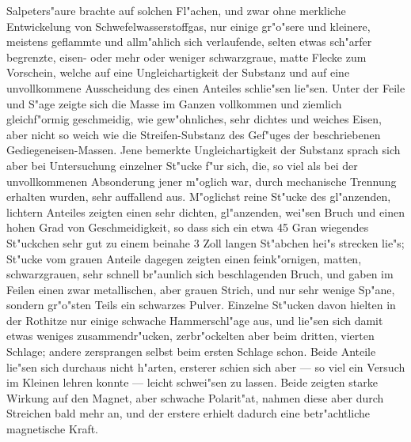 \documentclass[a4paper, 11pt, oneside, german]{article}
\begin{document}
{\hspace*{6mm}Salpeters"aure brachte auf solchen Fl"achen, und zwar ohne merkliche Entwickelung von Schwefelwasserstoffgas, nur einige gr"o"sere und kleinere, meistens geflammte und allm"ahlich sich verlaufende, selten etwas sch"arfer begrenzte, eisen- oder mehr oder weniger schwarzgraue, matte Flecke zum Vorschein, welche auf eine Ungleichartigkeit der Substanz und auf eine unvollkommene Ausscheidung des einen Anteiles schlie"sen lie"sen. Unter der Feile und S"age zeigte sich die Masse im Ganzen vollkommen und ziemlich gleichf"ormig geschmeidig, wie gew"ohnliches, sehr dichtes und weiches Eisen, aber nicht so weich wie die Streifen-Substanz des Gef"uges der beschriebenen Gediegeneisen-Massen. Jene bemerkte Ungleichartigkeit der Substanz sprach sich aber bei Untersuchung einzelner St"ucke f"ur sich, die, so viel als bei der unvollkommenen Absonderung jener m"oglich war, durch mechanische Trennung erhalten wurden, sehr auffallend aus. M"oglichst reine St"ucke des gl"anzenden, lichtern Anteiles zeigten einen sehr dichten, gl"anzenden, wei"sen Bruch und einen hohen Grad von Geschmeidigkeit, so dass sich ein etwa 45 Gran wiegendes St"uckchen sehr gut zu einem beinahe 3 Zoll langen St"abchen hei"s strecken lie"s; St"ucke vom grauen Anteile dagegen zeigten einen feink"ornigen, matten, schwarzgrauen, sehr schnell br"aunlich sich beschlagenden Bruch, und gaben im Feilen einen zwar metallischen, aber grauen Strich, und nur sehr wenige Sp"ane, sondern gr"o"sten Teils ein schwarzes Pulver. Einzelne St"ucken davon hielten in der Rothitze nur einige schwache Hammerschl"age aus, und lie"sen sich damit etwas weniges zusammendr"ucken, zerbr"ockelten aber beim dritten, vierten Schlage; andere zersprangen selbst beim ersten Schlage schon. Beide Anteile lie"sen sich durchaus nicht h"arten, ersterer schien sich aber --- so viel ein Versuch im Kleinen lehren konnte --- leicht schwei"sen zu lassen. Beide zeigten starke Wirkung auf den Magnet, aber schwache Polarit"at, nahmen diese aber durch Streichen bald mehr an, und der erstere erhielt dadurch eine betr"achtliche magnetische Kraft.\\
}
\end{document}
